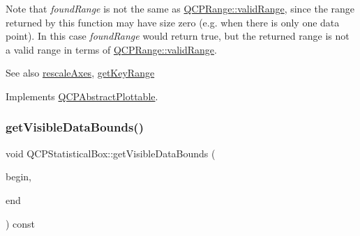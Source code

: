 Note that {\itshape found\+Range} is not the same as \hyperlink{class_q_c_p_range_ab38bd4841c77c7bb86c9eea0f142dcc0}{Q\+C\+P\+Range\+::valid\+Range}, since the range returned by this function may have size zero (e.\+g. when there is only one data point). In this case {\itshape found\+Range} would return true, but the returned range is not a valid range in terms of \hyperlink{class_q_c_p_range_ab38bd4841c77c7bb86c9eea0f142dcc0}{Q\+C\+P\+Range\+::valid\+Range}.

\begin{DoxySeeAlso}{See also}
\hyperlink{class_q_c_p_abstract_plottable_a1491c4a606bccd2d09e65e11b79eb882}{rescale\+Axes}, \hyperlink{class_q_c_p_statistical_box_a77d2d13301dfe60c13adfaa17fc1802f}{get\+Key\+Range} 
\end{DoxySeeAlso}


Implements \hyperlink{class_q_c_p_abstract_plottable_a4de773988b21ed090fddd27c6a3a3dcb}{Q\+C\+P\+Abstract\+Plottable}.

\mbox{\label{class_q_c_p_statistical_box_a1c24e86384a4aced91d5216fce86b175}} 
\subsubsection{\texorpdfstring{get\+Visible\+Data\+Bounds()}{getVisibleDataBounds()}}
{\footnotesize\ttfamily void Q\+C\+P\+Statistical\+Box\+::get\+Visible\+Data\+Bounds (\begin{DoxyParamCaption}\item[{\hyperlink{class_q_c_p_data_container_ae40a91f5cb0bcac61d727427449b7d15}{Q\+C\+P\+Statistical\+Box\+Data\+Container\+::const\+\_\+iterator} \&}]{begin,  }\item[{\hyperlink{class_q_c_p_data_container_ae40a91f5cb0bcac61d727427449b7d15}{Q\+C\+P\+Statistical\+Box\+Data\+Container\+::const\+\_\+iterator} \&}]{end }\end{DoxyParamCaption}) const\hspace{0.3cm}{\ttfamily [protected]}}

\mbox{\label{class_q_c_p_statistical_box_a233c28f8c2464ed104a4d580eedd4c64}} 
